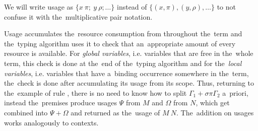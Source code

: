 We will write usage as $\{x \: \pi; \: y \: \rho; \dots \}$ instead of
$\{(x, \pi), (y, \rho), \dots\}$ to not confuse it with the~multiplicative pair
notation.

Usage accumulates the~resource consumption from throughout the~term and
the~typing algorithm uses it to check that an~appropriate amount of every
resource is available. For \emph{global variables}, i.e. variables that are free
in the~whole term, this check is done at the~end of the~typing algorithm and for
the~\emph{local variables}, i.e. variables that have a~binding occurrence
somewhere in the~term, the~check is done after accumulating its usage from its
scope. Thus, returning to the~example of rule , there is
no need to know how to split $\Gamma_1 + \sigma\pi\Gamma_2$ a~priori, instead
the~premises produce usages $\Psi$ from $M$ and $\Omega$ from $N$, which get
combined into $\Psi + \Omega$ and returned as the~usage of $M \: N$.
The~addition on usages works analogously to contexts.

